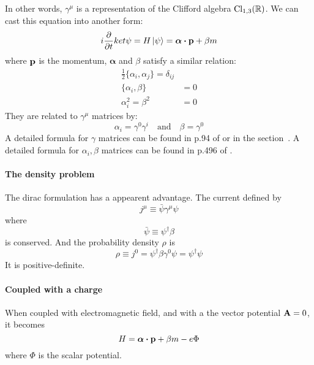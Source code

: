 \documentclass{article}
\begin{document}
In other words, $\gamma^\mu$ is a representation of the Clifford algebra
$\mathrm{Cl}_{1,3}(\mathbb{R})$. We can cast this equation into another form:
\begin{equation}
    i\pdv{t} ket{\psi} = H \ket{\psi} = \bm{\alpha}\vdot\vb{p}+\beta m
\end{equation}
where $\vb{p}$ is the momentum, $\bm{\alpha}$ and $\beta$ satisfy a similar
relation:
\begin{align}
    \frac{1}{2}\{\alpha_i,\alpha_j\} = \delta_{ij} \\
    \{\alpha_i,\beta\} &= 0 \\
    \alpha_i^2 = \beta^2 &= 0
\end{align}
They are related to $\gamma^\mu$ matrices by:
\begin{equation}
    \alpha_i = \gamma^0 \gamma^i \quad\text{and}\quad
    \beta = \gamma^0
\end{equation}
A detailed formula for $\gamma$ matrices can be found in p.94 of
\cite{zee2010quantum} or in the section~\todo{}. A detailed formula for $\alpha_i,\beta$
matrices can be found in p.496 of \cite{Sakurai2011}.

\paragraph{The density problem} The dirac formulation has a appearent advantage.
The current defined by
\begin{equation}
    j^\mu \equiv \bar{\psi}\gamma^\mu\psi
\end{equation}
where
\begin{equation}
    \bar{\psi} \equiv \psi^\dagger \beta
\end{equation}
is conserved. And the probability density $\rho$ is
\begin{equation}
    \rho \equiv j^0 = \psi^\dagger \beta \gamma^0 \psi = \psi^\dagger \psi
\end{equation}
It is positive-definite.

\paragraph{Coupled with a charge} When coupled with electromagnetic
field, and with a the vector potential $\vb{A}=0$, it becomes
\begin{equation}
    H = \bm{\alpha}\vdot\vb{p} + \beta m - e \Phi
\end{equation}
where $\Phi$ is the scalar potential.
\end{document}
